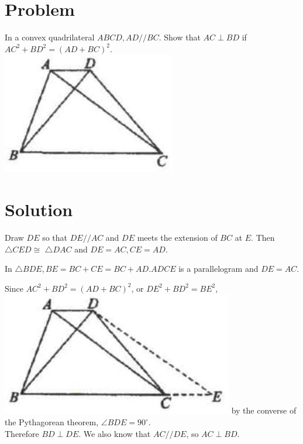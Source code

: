 \documentclass{article}
\begin{document}
\section*{Problem}
In a convex quadrilateral \(A B C D, A D / / B C\). Show that \(A C \perp B D\) if \(A C^{2}+B D^{2}=(A D+B C)^{2}\).\\
\centering
\includegraphics[width=\textwidth]{images/128(3).jpg}

\section*{Solution}
Draw \(D E\) so that \(D E / / A C\) and \(D E\) meets the extension of \(B C\) at \(E\). Then \(\triangle C E D \cong\) \(\triangle D A C\) and \(D E=A C, C E=A D\).

In \(\triangle B D E, B E=B C+C E=B C+A D . A D C E\) is a parallelogram and \(D E=A C\).

Since \(A C^{2}+B D^{2}=(A D+B C)^{2}\), or \(D E^{2}+B D^{2}=B E^{2}\),\\
\includegraphics[width=\textwidth]{images/138(1).jpg} by the converse of the Pythagorean theorem, \(\angle B D E=90^{\circ}\).\\
Therefore \(B D \perp D E\). We also know that \(A C / / D E\), so \(A C \perp B D\).
\end{document}
